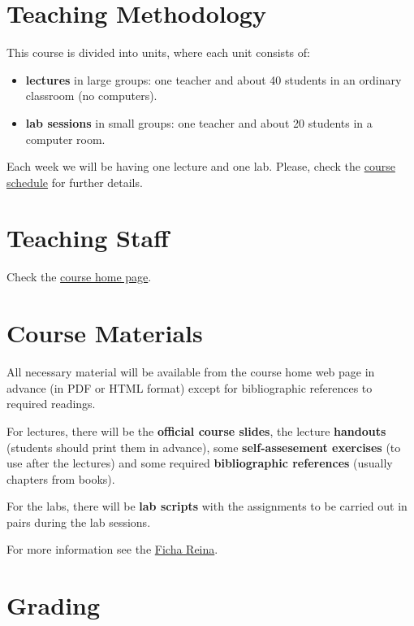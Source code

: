 \documentclass[11pt, a4paper, twoside]{article}
\begin{document}
\section{Teaching Methodology}

This course is divided into units, where each unit consists of:

\begin{itemize}

  \item \textbf{lectures} in large groups: one teacher and about 40 students in
    an ordinary classroom (no computers).

  \item \textbf{lab sessions} in small groups: one teacher and about 20
    students in a computer room.

\end{itemize}

Each week we will be having one lecture and one lab. Please, check the
\href{http://www.it.uc3m.es/alcortes/asig/1415/ps-ging/schedule.pdf}{course
schedule} for further details.

\section{Teaching Staff}

Check the
\href{http://it.uc3m.es/alcortes/asig/1415/ps-ging/index.html}{course home
page}.

\section{Course Materials}

All necessary material will be available from the course home web page in
advance (in PDF or HTML format) except for bibliographic references to required
readings.

For lectures, there will be the \textbf{official course slides}, the lecture
\textbf{handouts} (students should print them in advance), some
\textbf{self-assesement exercises} (to use after the lectures) and some
required \textbf{bibliographic references} (usually chapters from books).

For the labs, there will be \textbf{lab scripts} with the assignments to be
carried out in pairs during the lab sessions.

For more information see the
\href{https://www3.uc3m.es/reina/titulaciones.html}{Ficha Reina}.

\section{Grading}
\end{document}
